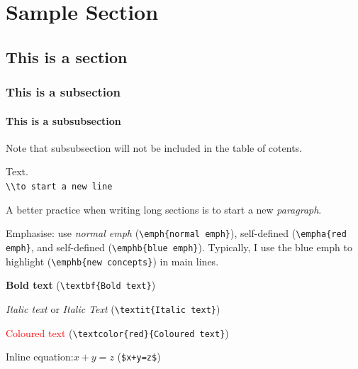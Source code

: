\chapter*{Sample Section}

\section{This is a section}

    \subsection{This is a subsection}
        
        \subsubsection{This is a subsubsection}

            Note that subsubsection will not be included in the table of cotents.
            
            Text.\\ %
            \verb!\\to start a new line!
            
            A better practice when writing long sections is to start a new \emph{paragraph}.
            
            Emphasise: use \emph{normal emph} (\verb!\emph{normal emph}!), self-defined  (\verb|\empha{red emph}|, and self-defined  (\verb|\emphb{blue emph}|). Typically, I use the blue emph to highlight  (\verb|\emphb{new concepts}|) in main lines.
            
            \textbf{Bold text} (\verb|\textbf{Bold text}|)
            
            \textit{Italic text} or \emph{Italic Text} (\verb|\textit{Italic text}|)
            
            \textcolor{red}{Coloured text} (\verb|\textcolor{red}{Coloured text}|)
            
            Inline equation:$x+y=z$ (\verb!$x+y=z$!)
            
